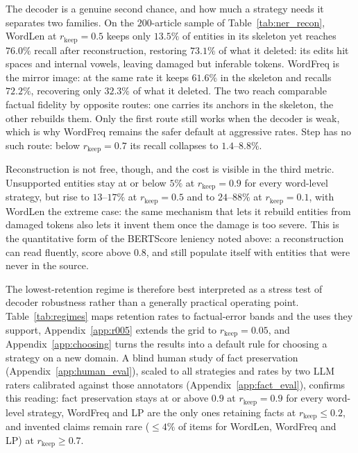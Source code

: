 \documentclass[11pt]{article}
\newcommand{\rkeep}{r_{\mathrm{keep}}}
\begin{document}
The decoder is a genuine second chance, and how much a strategy needs it separates two families.
On the $200$-article sample of Table~\ref{tab:ner_recon}, WordLen at $\rkeep = 0.5$ keeps only $13.5\%$ of entities in its skeleton yet reaches $76.0\%$ recall
after reconstruction, restoring $73.1\%$ of what it deleted: its edits hit spaces and internal vowels, leaving damaged but inferable tokens. WordFreq is the mirror image: at the same rate it keeps $61.6\%$ in
the skeleton and recalls $72.2\%$, recovering only $32.3\%$ of what it deleted. The two reach comparable
factual fidelity by opposite routes: one carries its anchors in the skeleton, the other rebuilds them. Only the first route still works when the decoder is weak, which is why WordFreq remains the safer
default at aggressive rates. Step has no such route: below $\rkeep = 0.7$ its recall collapses to $1.4$--$8.8\%$.

Reconstruction is not free, though, and the cost is visible in the third metric. Unsupported entities stay
at or below $5\%$ at $\rkeep = 0.9$ for every word-level strategy, but rise to $13$--$17\%$ at $\rkeep = 0.5$ and to
$24$--$88\%$ at $\rkeep = 0.1$, with WordLen the extreme case: the same mechanism that lets it rebuild
entities from damaged tokens also lets it invent them once the damage is too severe. This is the
quantitative form of the BERTScore leniency noted above: a reconstruction can read fluently, score
above $0.8$, and still populate itself with entities that were never in the source.

The lowest-retention regime is therefore best interpreted as a stress test of decoder robustness rather than a generally practical operating point. Table~\ref{tab:regimes} maps retention rates to factual-error bands and the uses they support, Appendix~\ref{app:r005} extends the grid to $\rkeep = 0.05$, and Appendix~\ref{app:choosing} turns the results into a default rule for choosing a strategy on a new domain. A blind human study of fact preservation (Appendix~\ref{app:human_eval}), scaled to all strategies and rates by two LLM raters calibrated against those annotators (Appendix~\ref{app:fact_eval}), confirms this reading: fact preservation stays at or above $0.9$ at $\rkeep=0.9$ for every word-level strategy, WordFreq and LP are the only ones retaining facts at $\rkeep\le0.2$, and invented claims remain rare ($\le4\%$ of items for WordLen, WordFreq and LP) at $\rkeep\ge0.7$.
\end{document}
